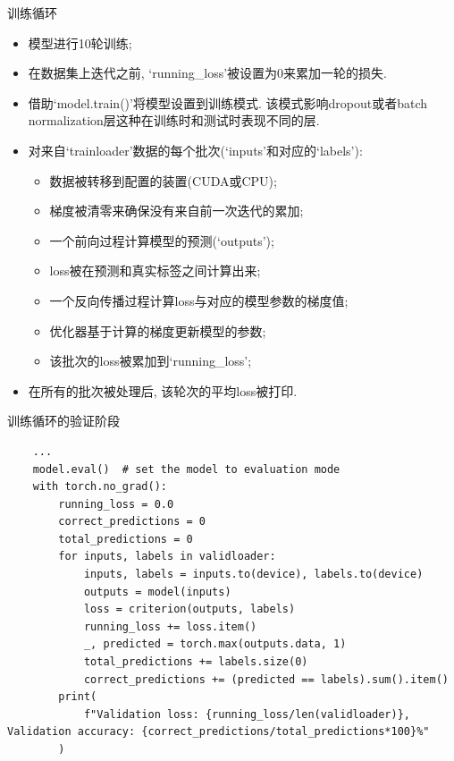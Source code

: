 \documentclass{beamer}
\begin{document}
\begin{frame}[fragile]{训练循环}
	\begin{itemize}
		\item 模型进行10轮训练;
		\item 在数据集上迭代之前, `running\_loss'被设置为0来累加一轮的损失.
		\item 借助`model.train()'将模型设置到训练模式. 该模式影响dropout或者batch normalization层这种在训练时和测试时表现不同的层.
		\item 对来自`trainloader'数据的每个批次(`inputs'和对应的`labels'):
		      \begin{itemize}
			      \item 数据被转移到配置的装置(CUDA或CPU);
			      \item 梯度被清零来确保没有来自前一次迭代的累加;
			      \item 一个前向过程计算模型的预测(`outputs');
			      \item loss被在预测和真实标签之间计算出来;
			      \item 一个反向传播过程计算loss与对应的模型参数的梯度值;
			      \item 优化器基于计算的梯度更新模型的参数;
			      \item 该批次的loss被累加到`running\_loss';
		      \end{itemize}
		\item 在所有的批次被处理后, 该轮次的平均loss被打印.
	\end{itemize}
\end{frame}

\begin{frame}[fragile]{训练循环的验证阶段}
	\begin{verbatim}
	...
    model.eval()  # set the model to evaluation mode
    with torch.no_grad():
        running_loss = 0.0
        correct_predictions = 0
        total_predictions = 0
        for inputs, labels in validloader:
            inputs, labels = inputs.to(device), labels.to(device)
            outputs = model(inputs)
            loss = criterion(outputs, labels)
            running_loss += loss.item()
            _, predicted = torch.max(outputs.data, 1)
            total_predictions += labels.size(0)
            correct_predictions += (predicted == labels).sum().item()
        print(
            f"Validation loss: {running_loss/len(validloader)}, Validation accuracy: {correct_predictions/total_predictions*100}%"
        )
	\end{verbatim}
\end{frame}
\end{document}
